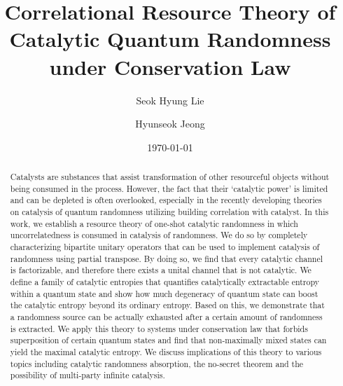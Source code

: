 \documentclass[aps, reprint, amsmath,amssymb, prx, superscriptaddress]{revtex4-2}
\begin{document}
\title{Correlational Resource Theory of\\Catalytic Quantum Randomness under Conservation Law}

\author{Seok Hyung Lie}
\author{Hyunseok Jeong}
%

\date{\today}

\begin{abstract}
Catalysts are substances that assist transformation of other resourceful objects without being consumed in the process. However, the fact that their `catalytic power' is limited and can be depleted is often overlooked, especially in the recently developing theories on catalysis of quantum randomness utilizing building correlation with catalyst.  In this work, we establish a resource theory of one-shot catalytic randomness in which uncorrelatedness is consumed in catalysis of randomness. We do so by completely characterizing bipartite unitary operators that can be used to implement catalysis of randomness using partial transpose. By doing so, we find that every catalytic channel is factorizable, and therefore there exists a unital channel that is not catalytic. We define a family of catalytic entropies that quantifies catalytically extractable entropy within a quantum state and show how much degeneracy of quantum state can boost the catalytic entropy beyond its ordinary entropy. Based on this, we demonstrate that a randomness source can be actually exhausted after a certain amount of randomness is extracted. We apply this theory to systems under conservation law that forbids superposition of certain quantum states and find that non-maximally mixed states can yield the maximal catalytic entropy. We discuss implications of this theory to various topics including catalytic randomness absorption, the no-secret theorem and the possibility of multi-party infinite catalysis.
\end{abstract}


\maketitle
\end{document}
